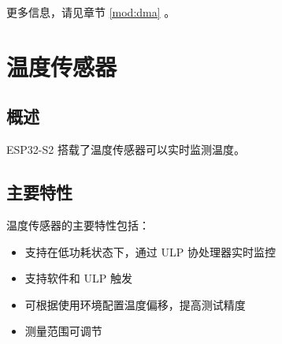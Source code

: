 \documentclass[main\_\_CN.tex]{subfiles}
\begin{document}
更多信息，请见章节 \ref{mod:dma} \textit{}。

\section{温度传感器}\label{ssec:tsensor}
\subsection{概述}
ESP32-S2 搭载了温度传感器可以实时监测温度。
\subsection{主要特性}
温度传感器的主要特性包括：
\begin{itemize}
    \item 支持在低功耗状态下，通过 ULP 协处理器实时监控
    \item 支持软件和 ULP 触发
    \item 可根据使用环境配置温度偏移，提高测试精度
    \item 测量范围可调节
\end{itemize}
\end{document}
